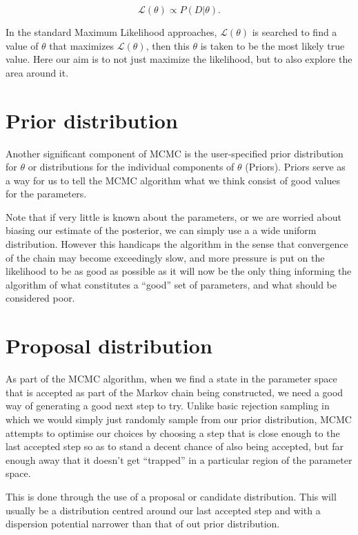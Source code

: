 \documentclass[12pt]{article}
\begin{document}
    $$
        \mathcal{L}(\theta) \propto P(D|\theta).
    $$

    In the standard Maximum Likelihood approaches, $\mathcal{L}(\theta)$ is searched to find a value of $\theta$ that maximizes $\mathcal{L}(\theta)$, then this $\theta$ is taken to be the most likely true value. Here our aim is to not just maximize the likelihood, but to also explore the area around it.


\section{Prior distribution}

    Another significant component of MCMC is the user-specified prior distribution for $\theta$ or distributions for the individual components of $\theta$ (Priors). Priors serve as a way for us to tell the MCMC algorithm what we think consist of good values for the parameters.

    Note that if very little is known about the parameters, or we are worried about biasing our estimate of the posterior, we can simply use a a wide uniform distribution. However this handicaps the algorithm in the sense that convergence of the chain may become exceedingly slow, and more pressure is put on the likelihood to be as good as possible as it will now be the only thing informing the algorithm of what constitutes a ``good'' set of parameters, and what should be considered poor.


\section{Proposal distribution}

    As part of the MCMC algorithm, when we find a state in the parameter space that is accepted as part of the Markov chain being constructed, we need a good way of generating a good next step to try. Unlike basic rejection sampling in which we would simply just randomly sample from our prior distribution, MCMC attempts to optimise our choices by choosing a step that is close enough to the last accepted step so as to stand a decent chance of also being accepted, but far enough away that it doesn't get ``trapped'' in a particular region of the parameter space.

    This is done through the use of a proposal or candidate distribution. This will usually be a distribution centred around our last accepted step and with a dispersion potential narrower than that of out prior distribution.
\end{document}
